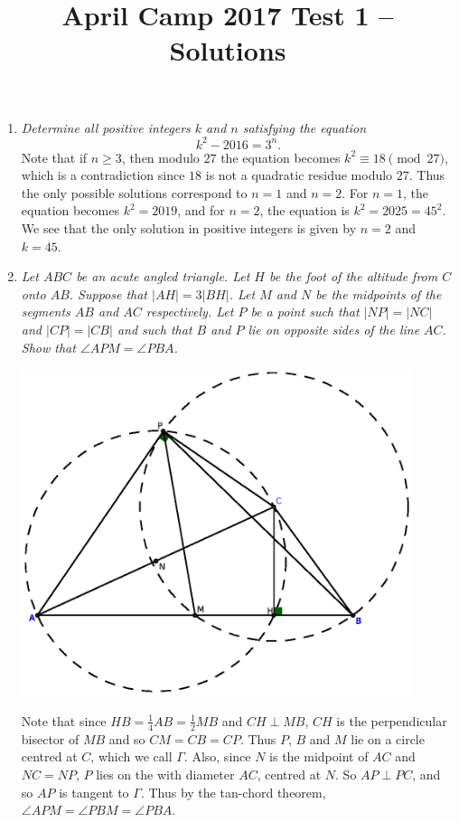 \documentclass[a4paper,12pt]{article}
\title{April Camp 2017 Test 1 -- Solutions}
\date{}
\begin{document}
 \maketitle

\begin{enumerate}
	\item 
	\textit{Determine all positive integers $k$ and $n$ satisfying the equation \[k^2 - 2016 = 3^n.\]}
	Note that if $n \geq 3$, then modulo $27$ the equation becomes $k^2 \equiv
	18 \pmod{27}$, which is a contradiction since $18$ is not a quadratic residue
	modulo $27$. Thus the only possible solutions correspond to $n=1$ and
	$n=2$. For $n=1$, the equation becomes $k^2 = 2019$, and for $n=2$, the
	equation is $k^2 = 2025 = 45^2$. We see that the only solution in
	positive integers is given by $n=2$ and $k=45$.
		
	\item 
	\textit{Let $ABC$ be an acute angled triangle. Let $H$ be the foot of the altitude from $C$ onto $AB$. Suppose that $|AH|=3|BH|$. Let $M$ and $N$ be the midpoints of the segments $AB$ and $AC$ respectively. Let $P$ be a point such that $|NP|=|NC|$ and $|CP|=|CB|$ and such that $B$ and $P$ lie on opposite sides of the line $AC$. Show that $\angle APM = \angle PBA$.}
	
	{\centering \includegraphics[width=0.9\textwidth]{T1Q2.eps}}
	
	Note that since $HB =\frac{1}{4}AB =\frac{1}{2}MB$ and $CH \perp MB$, $CH$ is the perpendicular bisector of $MB$ and so $CM=CB=CP$. Thus $P$, $B$ and $M$ lie on a circle centred at $C$, which we call $\Gamma$. Also, since $N$ is the midpoint of $AC$ and $NC=NP$, $P$ lies on the with diameter $AC$, centred at $N$. So $AP \perp PC$, and so $AP$ is tangent to $\Gamma$. Thus by the tan-chord theorem, $\angle APM =\angle PBM =\angle PBA$.
	

\end{enumerate}
\end{document}

